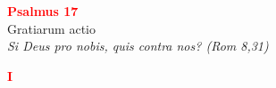 


\def\greinitialformat#1{%
{\fontsize{39}{39}\selectfont #1}%
}




\vspace{0.3cm}
\begin{center}
 \textcolor{red}{\large \bf Psalmus 17}\\
Gratiarum actio\\
\textit{\small Si Deus pro nobis, quis contra nos? (Rom 8,31)}
\end{center}
\begin{center}
\textcolor{red}{\bf I}
\end{center}
